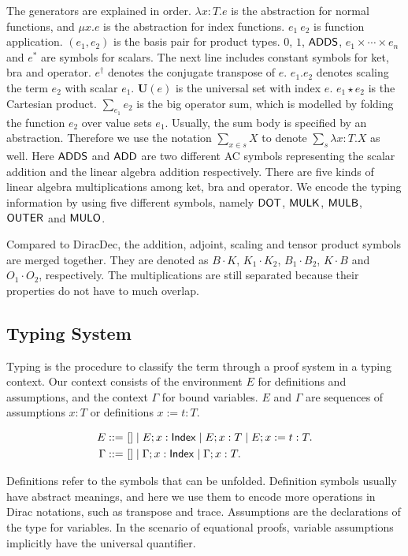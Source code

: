\documentclass[runningheads]{llncs}
\begin{document}
The generators are explained in order.
$\lambda x : T.e$ is the abstraction for normal functions, and $\mu x.e$ is the abstraction for index functions.
$e_1\ e_2$ is function application. 
$(e_1, e_2)$ is the basis pair for product types. $0$, $1$, $\mathsf{ADDS}$, $e_1 \times \cdots \times e_n$ and $e^*$ are symbols for scalars. 
The next line includes constant symbols for ket, bra and operator.
$e^\dagger$ denotes the conjugate transpose of $e$. $e_1.e_2$ denotes scaling the term $e_2$ with scalar $e_1$.
$\mathbf{U}(e)$ is the universal set with index $e$. $e_1 \star e_2$ is the Cartesian product. $\sum_{e_1} e_2$ is the big operator sum, which is modelled by folding the function $e_2$ over value sets $e_1$. Usually, the sum body is specified by an abstraction. Therefore we use the notation $\sum_{x \in s} X$ to denote $\sum_{s} \lambda x : T . X$ as well.
Here $\mathsf{ADDS}$ and $\mathsf{ADD}$ are two different AC symbols representing the scalar addition and the linear algebra addition respectively. 
There are five kinds of linear algebra multiplications among ket, bra and operator. We encode the typing information by using five different symbols, namely $\mathsf{DOT}$, $\mathsf{MULK}$, $\mathsf{MULB}$, $\mathsf{OUTER}$ and $\mathsf{MULO}$. 

Compared to DiracDec, the addition, adjoint, scaling and tensor product symbols are merged together.
They are denoted as $B\cdot K$, $K_1 \cdot K_2$, $B_1 \cdot B_2$, $K \cdot B$ and $O_1 \cdot O_2$, respectively.
The multiplications are still separated because their properties do not have to much overlap.


\subsection{Typing System}

Typing is the procedure to classify the term through a proof system in a typing context. 
Our context consists of the environment $E$ for definitions and assumptions, and the context $\Gamma$ for bound variables. 
$E$ and $\Gamma$ are sequences of assumptions $x : T$ or definitions $x := t : T$.

\begin{definition}
    \begin{align*}
        E ::=\ & [] \mid E; x : \mathsf{Index} \mid E; x : T \mid E; x := t : T. \\
        \Gamma ::=\ & [] \mid \Gamma; x : \mathsf{Index} \mid \Gamma; x : T.
    \end{align*}
\end{definition}
Definitions refer to the symbols that can be unfolded. Definition symbols usually have abstract meanings, and here we use them to encode more operations in Dirac notations, such as transpose and trace.
Assumptions are the declarations of the type for variables. In the scenario of equational proofs, variable assumptions implicitly have the universal quantifier.
\end{document}
